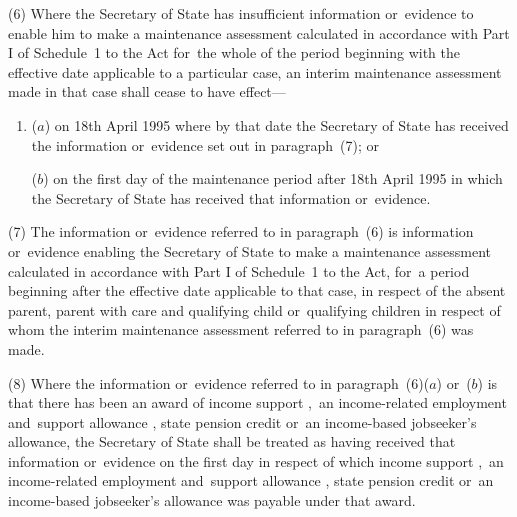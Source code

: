 \documentclass[a4paper,12pt]{article}
\begin{document}
(6) 
Where 
the Secretary of State  %
has insufficient information or~evidence to enable him to make a maintenance assessment calculated in accordance with Part I of Schedule~1 to the Act for~the whole of the period beginning with the effective date applicable to a particular case, an interim maintenance assessment made in that case shall cease to have effect—
\begin{enumerate}\item[]
($a$) on 18th April 1995 where by that date the Secretary of State has received the information or~evidence set out in paragraph~(7); or

($b$) on the first day of the maintenance period after 18th April 1995 in which the Secretary of State has received that information or~evidence.
\end{enumerate}

(7) The information or~evidence referred to in paragraph~(6) is information or~evidence enabling 
the Secretary of State  %
to make a maintenance assessment calculated in accordance with Part I of Schedule~1 to the Act, for~a period beginning after the effective date applicable to that case, in respect of the absent parent, parent with care and qualifying child or~qualifying children in respect of whom the interim maintenance assessment referred to in paragraph~(6) was made.


(8) Where the information or~evidence referred to in paragraph~(6)($a$) or~($b$) is that there has been an award of income support%
,~an income-related employment and~support allowance%
, state pension credit  %
or~an income-based jobseeker’s allowance, the Secretary of State shall be treated as having received that information or~evidence on the first day in respect of which income support%
,~an income-related employment and~support allowance%
, state pension credit  %
or~an income-based jobseeker’s allowance was payable under that award.
\end{document}
